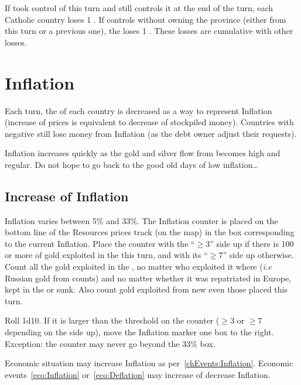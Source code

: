 \aparag[\villeRoma]
\bparag If \TUR took control of \villeRoma this turn and still controls it at
the end of the turn, each Catholic country loses 1 \STAB.
\bparag If \TUR controls \villeRoma without owning the province (either from
this turn or a previous one), the \SDCF loses 1 \STAB.
\bparag These losses are cumulative with other losses.

\section{Inflation}\label{chInter:Inflation}
\aparag Each turn, the \RT of each country is decreased as a way to represent
Inflation (increase of prices is equivalent to decrease of stockpiled money).
\bparag Countries with negative \RT still lose money from Inflation (as the
debt owner adjust their requests).

\begin{designnote}
  Inflation increases quickly as the gold and silver flow from
  \continentAmerica becomes high and regular. Do not hope to go back to the
  good old days of low inflation\ldots
\end{designnote}

\subsection{Increase of Inflation}
\aparag Inflation varies between 5\% and 33\%. The Inflation counter is placed
on the bottom line of the Resources prices track (on the \ROTW map) in the box
corresponding to the current Inflation.
\bparag Place the counter with the ``$\geq 3$'' side up if there is 100\ducats
or more of gold exploited in the \ROTW this turn, and with its ``$\geq 7$''
side up otherwise.
\bparag Count all the gold exploited in the \ROTW, no matter who exploited it
where (\emph{i.e} Russian gold from \continentSiberia counts) and no matter
whether it was repatriated in Europe, kept in the \ROTW or sunk.
\bparag Also count gold exploited from new \COL even those placed this turn.

 Roll 1d10. If it is larger than the
threshold on the counter ($\geq 3$ or $\geq 7$ depending on the side up), move
the Inflation marker one box to the right.
\bparag Exception: the counter may never go beyond the 33\% box.

\bparag Economic situation may increase Inflation as
per~\ref{chEvents:Inflation}.
\bparag Economic events~\ref{eco:Inflation} or~\ref{eco:Deflation} may
increase of decrease Inflation.

